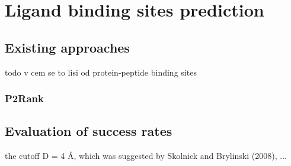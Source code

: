 \chapter{Ligand binding sites prediction}

\section{Existing approaches}

todo v cem se to lisi od protein-peptide binding sites

\subsection{P2Rank}

\section{Evaluation of success rates}



 the cutoff D = 4 Å, which was suggested by Skolnick and Brylinski (2008),
...
